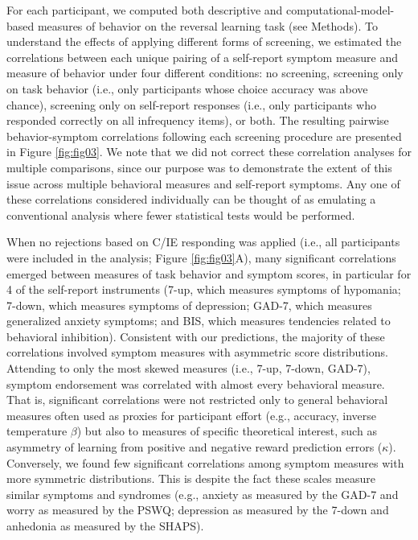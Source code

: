 \documentclass[a4paper,notitlepage,12pt]{article}
\begin{document}
For each participant, we computed both descriptive and computational-model-based measures of behavior on the reversal learning task (see Methods). To understand the effects of applying different forms of screening, we estimated the correlations between each unique pairing of a self-report symptom measure and measure of behavior under four different conditions: no screening, screening only on task behavior (i.e., only participants whose choice accuracy was above chance), screening only on self-report responses (i.e., only participants who responded correctly on all infrequency items), or both. The resulting pairwise behavior-symptom correlations following each screening procedure are presented in Figure \ref{fig:fig03}. We note that we did not correct these correlation analyses for multiple comparisons, since our purpose was to demonstrate the extent of this issue across multiple behavioral measures and self-report symptoms. Any one of these correlations considered individually can be thought of as emulating a conventional analysis where fewer statistical tests would be performed.

When no rejections based on C/IE responding was applied (i.e., all participants were included in the analysis; Figure \ref{fig:fig03}A), many significant correlations emerged between measures of task behavior and symptom scores, in particular for 4 of the self-report instruments (7-up, which measures symptoms of hypomania; 7-down, which measures symptoms of depression; GAD-7, which measures generalized anxiety symptoms; and BIS, which measures tendencies related to behavioral inhibition). Consistent with our predictions, the majority of these correlations involved symptom measures with asymmetric score distributions. Attending to only the most skewed measures (i.e., 7-up, 7-down, GAD-7), symptom endorsement was correlated with almost every behavioral measure. That is, significant correlations were not restricted only to general behavioral measures often used as proxies for participant effort (e.g., accuracy, inverse temperature $\beta$) but also to measures of specific theoretical interest, such as asymmetry of learning from positive and negative reward prediction errors ($\kappa$). Conversely, we found few significant correlations among symptom measures with more symmetric distributions. This is despite the fact these scales measure similar symptoms and syndromes (e.g., anxiety as measured by the GAD-7 and worry as measured by the PSWQ; depression as measured by the 7-down and anhedonia as measured by the SHAPS). 
\end{document}
